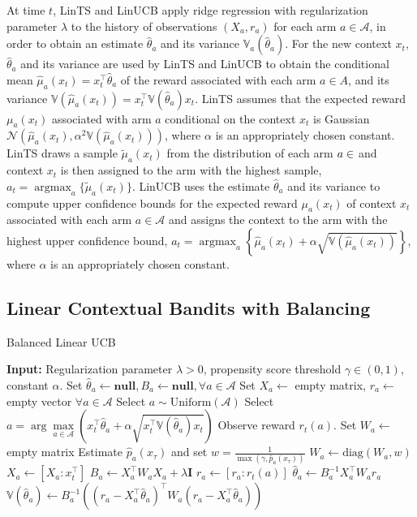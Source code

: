 \documentclass[letterpaper]{article} %
\newcommand{\field}[1]{\mathbb{#1}}
\def\A{\mathcal{A}}
\def\B{B}
\def\I{\mathbf{I}}
\def\N{\mathcal{N}}
\def\V{\field{V}}
\def\V{\mathbb{V}}
\DeclareMathOperator*{\argmax}{argmax}
\begin{document}
At time $t$, LinTS and LinUCB apply ridge regression with regularization parameter $\lambda$ to the history of observations $(X_a, r_a)$ for each arm $a \in \A$, in order to obtain an estimate $\hat{\theta}_a$ and its variance $\V_a(\hat\theta_a)$.
For the new context $x_t$, $\hat{\theta}_a$ and its variance are used by LinTS and LinUCB to obtain the conditional mean $\hat{\mu}_a(x_t)=x_t^\top\hat\theta_a$  of the reward associated with each arm $a \in A$, and its  variance $\V(\hat{\mu}_a(x_t))=x^\top_t \V(\hat\theta_a) x_t $.
LinTS assumes that the expected reward $\mu_a(x_t)$ associated with arm $a$ conditional on the context $x_t$ is Gaussian $ \N\left(\hat{\mu}_a(x_t), \alpha^2\V(\hat{\mu}_a(x_t)) \right)$, where $\alpha$ is an appropriately chosen constant.
LinTS draws a sample $\tilde{\mu}_a(x_t)$ from the distribution of each arm $a \in \cal$ and context $x_t$ is then assigned to the arm with the highest sample, $a_t = \argmax_a \{\tilde{\mu}_{a}(x_t)\}$. 
LinUCB uses the estimate $\hat{\theta}_a$ and its variance to compute upper confidence bounds for the expected reward $\mu_a(x_t)$ of context $x_t$ associated with each arm $a \in \A$ and assigns the context to the arm with the highest upper confidence bound, $a_t = \argmax_a\left\{\hat{\mu}_a(x_t) + \alpha \sqrt{\V(\hat{\mu}_a(x_t))}\right\}$, where $\alpha$ is an appropriately chosen constant.




\subsection{Linear Contextual Bandits with Balancing} \label{blcb}




\begin{algorithm}[t]
\caption{Balanced Linear UCB} 
\label{alg:BLUCB}
\begin{algorithmic}[1]
\State \textbf{Input:} Regularization parameter $\lambda > 0$, propensity score threshold $\gamma \in (0, 1)$, constant $\alpha$.
\State Set $\hat{\theta}_a \leftarrow \textbf{null}, \B_a \leftarrow \textbf{null}, \forall a \in \mathcal{A}$
\State Set $X_a \leftarrow$ empty matrix, $r_a \leftarrow$ empty vector $\forall a \in \mathcal{A}$
\If {$\exists a \in \A \text{ s.t. }\hat{\theta}_a = \textbf{null}$ or $\B_a = \textbf{null}$}
\State Select $a \sim \text{Uniform}(\A)$
\Else
\State Select $a = \arg\max\limits_{a\in\A} \left(x_t^\top \hat{\theta}_a + \alpha \sqrt{x_t^\top  \V(\hat\theta_a) x_t}\right)$
\EndIf
\State Observe reward $r_t(a)$.
\State Set $W_a \leftarrow $ empty matrix
\State Estimate $\hat{p}_a(x_\tau)$ and set $w = \frac{1}{\max(\gamma, \hat{p}_a(x_\tau))}$
\State $W_a \leftarrow \text{diag}(W_a, w)$
\EndFor
\State $X_a \leftarrow [X_a : x_t^\top]$
\State $B_a \leftarrow X_a^\top W_a X_a + \lambda \I$
\State $r_a \leftarrow [r_a : r_t(a)]$ 
\State $\hat{\theta}_a \leftarrow B_a^{-1} X_a^\top W_a r_a$
\State $\V(\hat\theta_a)\leftarrow  B_a^{-1}\left((r_a-X_a^\top\hat\theta_a)^\top W_a(r_a-X_a^\top\hat\theta_a)\right) $
\EndFor
\end{algorithmic}
\end{algorithm}
\end{document}
